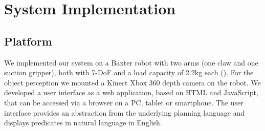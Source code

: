 %



\section{System Implementation}
\label{sec:system}
\subsection{Platform}
\label{sec:platform}
We implemented our system on a Baxter robot with two arms (one claw and one suction gripper), both with 7-DoF and a load capacity of 2.2kg each ().
For the object perception we mounted a Kinect Xbox 360 depth camera on the robot.
We developed a user interface as a web application, based on HTML and JavaScript, that can be accessed via a browser on a PC, tablet or smartphone.
The user interface provides an abstraction from the underlying planning language and displays predicates in natural language in English.

